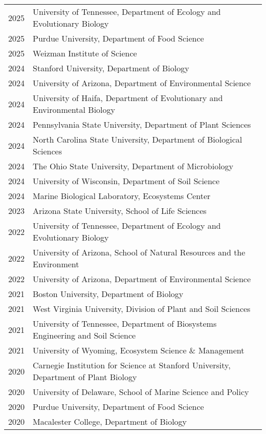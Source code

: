 \documentclass[11pt]{article}
\begin{document}
\begin{longtable}{@{}p{4em}@{\hspace{2em}}p{}@{}}
2025 & University of Tennessee, Department of Ecology and Evolutionary Biology \\
2025 & Purdue University, Department of Food Science \\
2025 & Weizman Institute of Science \\
2024 & Stanford University, Department of Biology \\
2024 & University of Arizona, Department of Environmental Science \\
2024 & University of Haifa, Department of Evolutionary and Environmental Biology \\
2024 & Pennsylvania State University, Department of Plant Sciences \\
2024 & North Carolina State University, Department of Biological Sciences \\
2024 & The Ohio State University, Department of Microbiology \\
2024 & University of Wisconsin, Department of Soil Science \\
2024 & Marine Biological Laboratory, Ecosystems Center \\
2023 & Arizona State University, School of Life Sciences \\
2022 & University of Tennessee, Department of Ecology and Evolutionary Biology \\
2022 & University of Arizona, School of Natural Resources and the Environment \\
2022 & University of Arizona, Department of Environmental Science \\
2021 & Boston University, Department of Biology \\
2021 & West Virginia University, Division of Plant and Soil Sciences \\
2021 & University of Tennessee, Department of Biosystems Engineering and Soil Science \\
2021 & University of Wyoming, Ecosystem Science \& Management \\
2020 & Carnegie Institution for Science at Stanford University, Department of Plant Biology \\
2020 & University of Delaware, School of Marine Science and Policy \\
2020 & Purdue University, Department of Food Science \\
2020 & Macalester College, Department of Biology \\

\end{longtable}
\end{document}
